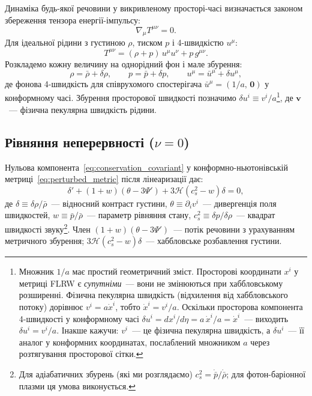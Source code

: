 Динаміка будь-якої речовини у викривленому просторі-часі
визначається законом збереження тензора енергії-імпульсу:
\begin{equation}\label{eq:conservation_covariant}
  \nabla_\mu T^{\mu\nu} = 0.
\end{equation}
Для ідеальної рідини з густиною $\rho$, тиском $p$ і
4-швидкістю $u^\mu$:
\begin{equation}\label{eq:Tmunu_fluid}
  T^{\mu\nu} = (\rho + p)\,u^\mu u^\nu + p\,g^{\mu\nu}.
\end{equation}
Розкладемо кожну величину на однорідний фон і мале збурення:
\begin{equation*}
  \rho = \bar\rho + \delta\rho, \qquad
  p    = \bar p   + \delta p,   \qquad
  u^\mu = \bar u^\mu + \delta u^\mu,
\end{equation*}
де фонова 4-швидкість для співрухомого спостерігача
$\bar u^\mu = (1/a,\, \mathbf{0})$ у конформному часі.
Збурення просторової швидкості позначимо
$\delta u^i \equiv v^i/a$\footnote{%
Множник $1/a$ має простий геометричний зміст.
Просторові координати $x^i$ у метриці FLRW є \emph{супутніми}~---
вони не змінюються при хаббловському розширенні.
Фізична пекулярна швидкість (відхилення від хаббловського потоку)
дорівнює $v^i = a\dot{x}^i$, тобто $\dot{x}^i = v^i/a$.
Оскільки просторова компонента 4-швидкості у конформному часі
$\delta u^i = dx^i/d\eta = a\,\dot{x}^i/a = \dot{x}^i$~---
виходить $\delta u^i = v^i/a$.
Інакше кажучи: $v^i$~--- це фізична пекулярна швидкість,
а $\delta u^i$~--- її аналог у конформних координатах,
послаблений множником $a$ через розтягування просторової сітки.%
}, де $\mathbf{v}$~--- фізична
пекулярна швидкість рідини.

\subsection*{Рівняння неперервності ($\nu = 0$)}

Нульова компонента~\eqref{eq:conservation_covariant}
у конформно-ньютонівській метриці~\eqref{eq:perturbed_metric}
після лінеаризації дає:
\begin{equation}\label{eq:continuity_general}
  \delta' + (1+w)\left(\theta - 3\Psi'\right)
  + 3\mathcal{H}\left(c_s^2 - w\right)\delta = 0,
\end{equation}
де $\delta \equiv \delta\rho/\bar\rho$~--- відносний контраст
густини, $\theta \equiv \partial_i v^i$~--- дивергенція поля
швидкостей, $w \equiv \bar p/\bar\rho$~--- параметр рівняння
стану, $c_s^2 \equiv \delta p/\delta\rho$~--- квадрат швидкості
звуку\footnote{%
Для адіабатичних збурень (які ми розглядаємо) $c_s^2 = \dot{\bar p}/\dot{\bar\rho}$;
для фотон-баріонної плазми ця умова виконується.}.
Член $(1+w)(\theta - 3\Psi')$~--- потік речовини з
урахуванням метричного збурення; $3\mathcal{H}(c_s^2 - w)\delta$~---
хаббловське розбавлення густини.

